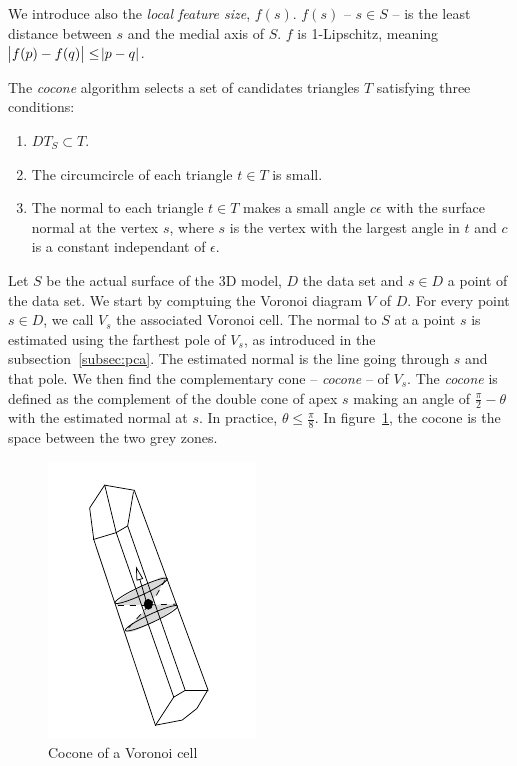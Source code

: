 \documentclass[12pt]{article}
\begin{document}
We introduce also the \emph{local feature size}, $f(s)$. $f(s)$ -- $s \in S$ -- is the least distance between $s$ and the medial axis of $S$. $f$ is 1-Lipschitz, meaning $\abs{f(p) - f(q)}\le\abs{p - q}$.

The \emph{cocone} algorithm selects a set of candidates triangles $T$ satisfying three conditions:
\begin{enumerate}
\item $DT_S \subset T$.
\item The circumcircle of each triangle $t \in T$ is small.
\item The normal to each triangle $t \in T$ makes a small angle $c\epsilon$ with the surface normal at the vertex $s$, where $s$ is the vertex with the largest angle in $t$ and $c$ is a constant independant of $\epsilon$.
\end{enumerate}

Let $S$ be the actual surface of the 3D model, $D$ the data set and $s \in D$ a point of the data set. We start by comptuing the Voronoi diagram $V$ of $D$. For every point $s \in D$, we call $V_s$ the associated Voronoi cell. The normal to $S$ at a point $s$ is estimated using the farthest pole of $V_s$, as introduced in the subsection~\ref{subsec:pca}. The estimated normal is the line going through $s$ and that pole. We then find the complementary cone -- \emph{cocone} -- of $V_s$. The \emph{cocone} is defined as the complement of the double cone of apex $s$ making an angle of $\frac{\pi}{2}-\theta$ with the estimated normal at $s$. In practice, $\theta\le\frac{\pi}{8}$. In figure~\ref{coc}, the cocone is the space between the two grey zones.

\begin{figure}[h]
  \centering
  \includegraphics[scale=0.3]{Cocone.png}
  \caption{\label{coc} Cocone of a Voronoi cell}
\end{figure}
\end{document}
